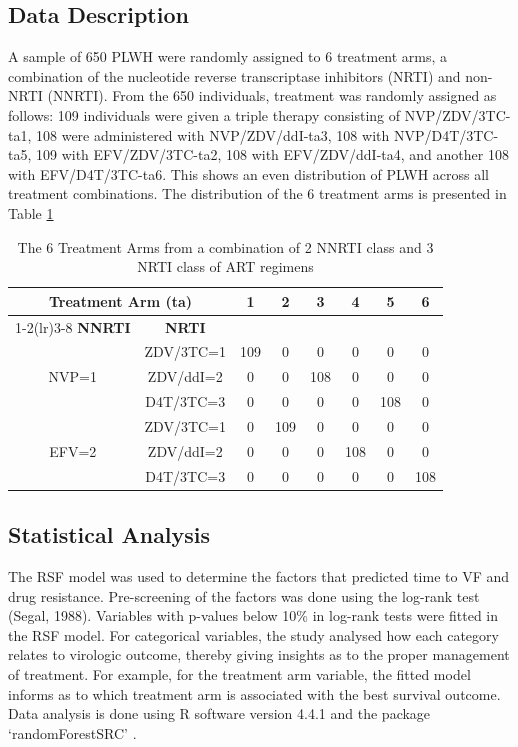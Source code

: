\documentclass[10pt]{NSP1}
\begin{document}
\subsection{Data Description}
A sample of 650 PLWH were randomly assigned to 6 treatment arms, a combination of the nucleotide reverse transcriptase inhibitors (NRTI) and non-NRTI (NNRTI). From the 650 individuals, treatment was randomly assigned as follows: 109 individuals were given a triple therapy consisting of NVP/ZDV/3TC-ta1, 108 were administered with NVP/ZDV/ddI-ta3, 108 with NVP/D4T/3TC-ta5, 109 with EFV/ZDV/3TC-ta2, 108 with EFV/ZDV/ddI-ta4, and another 108 with EFV/D4T/3TC-ta6. This shows an even distribution of PLWH across all treatment combinations. The distribution of the 6 treatment arms is presented in Table \ref{tab:treatmentarms}

\begin{table}[H]
    \centering
    \caption{The 6 Treatment Arms from a combination of 2 NNRTI class and 3 NRTI class of ART regimens}
    \label{tab:treatmentarms}
    \begin{tabular}{|c|c|c|c|c|c|c|c|}
        \toprule
        \multicolumn{2}{c|}{\textbf{Treatment Arm (ta)}} & \textbf{1} & \textbf{2} & \textbf{3} & \textbf{4} & \textbf{5} & \textbf{6} \\
        \cmidrule(lr){1-2}\cmidrule(lr){3-8}
        \textbf{NNRTI} & \textbf{NRTI} & & & & & & \\
        \midrule
        \multirow{3}{*}{NVP=1} & ZDV/3TC=1 & 109 & 0 & 0 & 0 & 0 & 0 \\
        & ZDV/ddI=2 & 0 & 0 & 108 & 0 & 0 & 0 \\
        & D4T/3TC=3 & 0 & 0 & 0 & 0 & 108 & 0 \\
        \midrule
        \multirow{3}{*}{EFV=2} & ZDV/3TC=1 & 0 & 109 & 0 & 0 & 0 & 0 \\
        & ZDV/ddI=2 & 0 & 0 & 0 & 108 & 0 & 0 \\
        & D4T/3TC=3 & 0 & 0 & 0 & 0 & 0 & 108 \\
        \bottomrule
    \end{tabular}
\end{table}

\subsection{Statistical Analysis }
The RSF model \cite{Breiman2003} was used to determine the factors that predicted time to VF and drug resistance. Pre-screening of the factors was done using the log-rank test (Segal, 1988). Variables with p-values below 10\% in log-rank tests were fitted in the RSF model. For categorical variables, the study analysed how each category relates to virologic outcome, thereby giving insights as to the proper management of treatment. For example, for the treatment arm variable, the fitted model informs as to which treatment arm is associated with the best survival outcome. Data analysis is done using R software version 4.4.1 and the package ‘randomForestSRC’ \cite{Ishwaran2025}.
\end{document}
